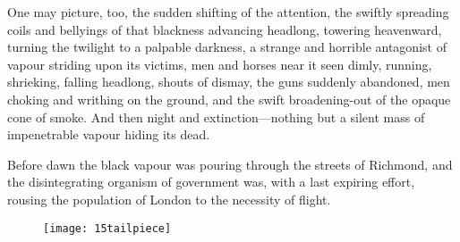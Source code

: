 One may picture, too, the sudden shifting of the attention, the swiftly spreading coils and bellyings of that blackness advancing headlong, towering heavenward, turning the twilight to a palpable darkness, a strange and horrible antagonist of vapour striding upon its victims, men and horses near it seen dimly, running, shrieking, falling headlong, shouts of dismay, the guns suddenly abandoned, men choking and writhing on the ground, and the swift broadening-out of the opaque cone of smoke. And then night and extinction—nothing but a silent mass of impenetrable vapour hiding its dead.

Before dawn the black vapour was pouring through the streets of Richmond, and the disintegrating organism of government was, with a last expiring effort, rousing the population of London to the necessity of flight.

\begin{figure}[b!]
\centering
\texttt{[image: 15tailpiece]}
\end{figure}